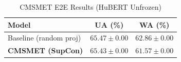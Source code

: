 \begin{table}[h]
\centering
\caption{CMSMET E2E Results (HuBERT Unfrozen)}
\begin{tabular}{lcc}
\toprule
Model & UA (\%) & WA (\%) \\
\midrule
Baseline (random proj) & $65.47 \pm 0.00$ & $62.86 \pm 0.00$ \\
\textbf{CMSMET (SupCon)} & $\mathbf{65.43 \pm 0.00}$ & $\mathbf{61.57 \pm 0.00}$ \\
\bottomrule
\end{tabular}
\end{table}
